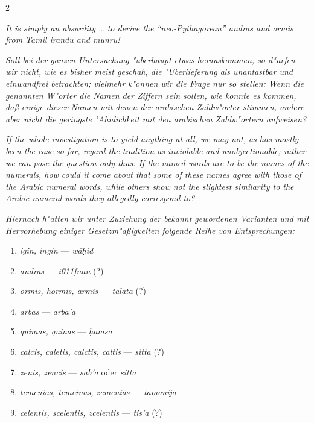 \documentclass[10pt,a4paper]{article}
\newcommand{\enquote}[1]{``#1''}
\begin{document}
\begin{paracol}{2}
\switchcolumn

\textit{It is simply an absurdity \ldots{} to derive the \enquote{neo-Pythagorean} \textit{andras} and \textit{ormis} from Tamil \textit{irandu} and \textit{munru}!}

\switchcolumn*

\textit{Soll bei der ganzen Untersuchung "uberhaupt etwas herauskommen, so d"urfen wir nicht, wie es bisher meist geschah, die "Uberlieferung als unantastbar und einwandfrei betrachten; vielmehr k"onnen wir die Frage nur so stellen: Wenn die genannten W"orter die Namen der Ziffern sein sollen, wie konnte es kommen, da\ss{} einige dieser Namen mit denen der arabischen Zahlw"orter stimmen, andere aber nicht die geringste "Ahnlichkeit mit den arabischen Zahlw"ortern aufweisen?}

\switchcolumn

\textit{If the whole investigation is to yield anything at all, we may not, as has mostly been the case so far, regard the tradition as inviolable and unobjectionable; rather we can pose the question only thus: If the named words are to be the names of the numerals, how could it come about that some of these names agree with those of the Arabic numeral words, while others show not the slightest similarity to the Arabic numeral words they allegedly correspond to?}

\switchcolumn*

\textit{Hiernach h"atten wir unter Zuziehung der bekannt gewordenen Varianten und mit Hervorhebung einiger Gesetzm"a\ss{}igkeiten folgende Reihe von Entsprechungen:}

\begin{enumerate}
\item[(1)] \textit{igin, ingin} --- \textit{w\=a\d{h}id}
\item[(2)] \textit{andras} --- \textit{i\u011fn\=an} (?)
\item[(3)] \textit{ormis, hormis, armis} --- \textit{tal\=ata} (?)
\item[(4)] \textit{arbas} --- \textit{arba'a}
\item[(5)] \textit{quimas, quinas} --- \textit{\d{h}amsa}
\item[(6)] \textit{calcis, caletis, calctis, caltis} --- \textit{sitta} (?)
\item[(7)] \textit{zenis, zencis} --- \textit{sab'a} oder \textit{sitta}
\item[(8)] \textit{temenias, temeinas, zemenias} --- \textit{tam\=anija}
\item[(9)] \textit{celentis, scelentis, zcelentis} --- \textit{tis'a} (?)
\end{enumerate}


\end{paracol}
\end{document}
